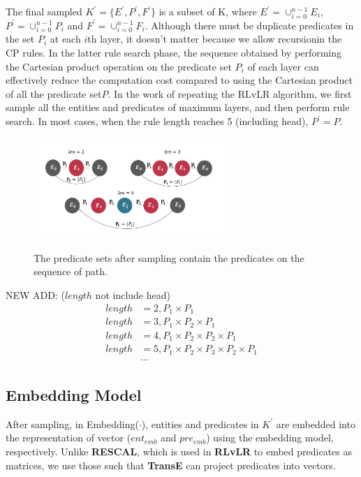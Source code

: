 \documentclass{article}
\begin{document}
	The final sampled $K^{'} = \{E^{'}, P^{'}, F^{'}\}$ is a subset of K, where $E^{'}=\cup^{n-1}_{i=0}E_i$, $P^{'}=\cup^{n-1}_{i=0}P_i$ and $F^{'}=\cup^{n-1}_{i=0}F_i$. 
	Although there must be duplicate predicates in the set $P_i$ at each $i$th layer, it doesn't matter because we allow recursionin the CP rules. In the latter rule search phase, the sequence obtained by performing the Cartesian product operation on the predicate set $P_i$ of each layer can effectively reduce the computation cost compared to using the Cartesian product of all the predicate set$P$.
	In the work of repeating the RLvLR algorithm, we first sample all the entities and predicates of maximum layers, and then perform rule search. In most cases, when the rule length reaches 5 (including head), $P^{'}=P$.
	\begin{figure}
		\centering
		\includegraphics[scale=0.4,height=38mm]{rule.pdf}\\
		\caption{The predicate sets after sampling contain the predicates on the sequence of path.}
		\label{fig:rule}
	\end{figure}
	NEW ADD:
	($length$ not include head)
	\begin{align}
		length &= 2, P_1\times P_1 \nonumber\\
		length &= 3, P_1\times P_2\times P_1 \nonumber\\
		length &= 4, P_1\times P_2\times P_2\times P_1 \nonumber\\
		length &= 5, P_1\times P_2\times P_3\times P_2\times P_1 \nonumber\\
		&\cdots \nonumber
	\end{align}
	
	
	\subsection{Embedding Model}
	After sampling, in \textsf{Embedding($\cdot$)}, entities and predicates in $K^{'}$ are embedded into the representation of vector ($ent_{emb}$ and $pre_{emb}$) using the embedding model, respectively. Unlike {\bf RESCAL}, which is used in {\bf RLvLR} to embed predicates as matrices, we use those such that {\bf TransE} can project predicates into vectors.
\end{document}
